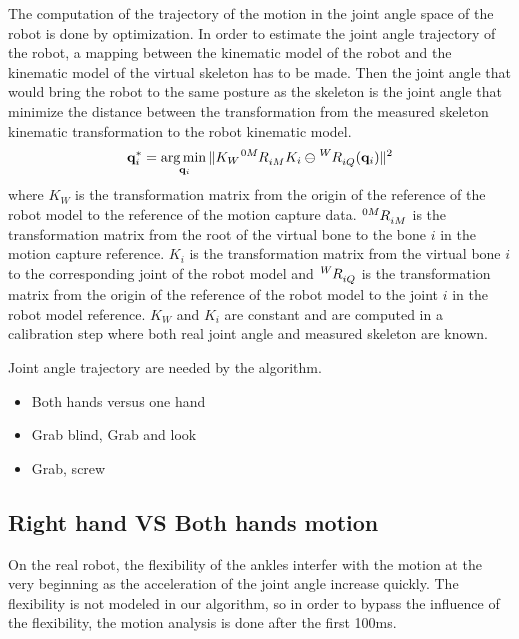 \documentclass[letterpaper, 10pt, conference]{ieeeconf}      %
\begin{document}
The computation of the trajectory of the motion in the joint angle space
of the robot is done by optimization.
In order to estimate the joint angle trajectory of the robot, a mapping between
the kinematic model of the robot and the kinematic model of the virtual skeleton
has to be made. Then the joint angle that would bring the robot to the same posture
as the skeleton is the joint angle that minimize the distance between
the transformation from the measured skeleton kinematic transformation to the robot kinematic model.
\begin{equation}
  \mbf{q}^*_i = \underset{\mbf{q}_i}\argmin \Vert K_W\tensor[^{0M}]{R}{_{iM}}K_i \ominus \tensor[^W]{R}{_{iQ}}(\mbf{q}_i) \Vert ^2\\
  \label{mocapOpti}
\end{equation}
where $K_W$ is the transformation matrix from the origin of the reference of the robot model to the reference of the 
motion capture data. $\tensor[^{0M}]{R}{_{iM}}$ is the transformation matrix from the root of the virtual bone to
the bone $i$ in the motion capture reference. $K_i$ is the transformation matrix from the virtual bone $i$ to
the corresponding joint of the robot model and $\tensor[^W]{R}{_{iQ}}$ is the transformation matrix from 
the origin of the reference of the robot model to the joint $i$ in the robot model reference.
$K_W$ and $K_i$ are constant and are computed in a calibration step where both real joint angle and
measured skeleton are known.

Joint angle trajectory are needed by the algorithm.

\begin{itemize}
  \item Both hands versus one hand
  \item Grab blind, Grab and look
  \item Grab, screw
\end{itemize}

\subsection{Right hand VS Both hands motion}
On the real robot, the flexibility of the ankles interfer with the motion at the very beginning as the acceleration
of the joint angle increase quickly. The flexibility is not modeled in our algorithm, so
in order to bypass the influence of the flexibility, the motion analysis is done after the first 100ms.
\end{document}
